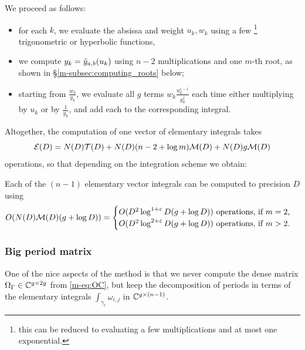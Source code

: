 \documentclass[main.tex]{subfiles}
\begin{document}
   We proceed as follows:
   \begin{itemize}
   \item for each $k$, we evaluate the absissa and weight $u_k,w_k$ using
       a few \footnote{this can be reduced to evaluating
           a few multiplications and at most one exponential.} trigonometric or hyperbolic functions,
   \item we compute $y_k=\tilde{y}_{a,b}(u_k)$ using $n-2$ multiplications and one $m$-th root,
       as shown in \S \ref{m-subsec:computing_roots} below;
   \item starting from $\frac{w_k}{y_k}$, we evaluate all $g$ terms $w_k\frac{u_k^{i-1}}{y_k^j}$
       each time either multiplying by $u_k$ or by $\frac{1}{y_k}$, and add each to the corresponding
       integral.
   \end{itemize}

   Altogether, the computation of one vector of elementary integrals takes
   \begin{equation}\label{eq:elem_int_complexity}
    \mathcal E(D) = N(D)\mathcal T(D)+N(D)(n-2+\log m)\mathcal M(D)+N(D)g\mathcal M(D)
   \end{equation}
    operations,
   so that depending on the integration scheme we obtain:
   \begin{thm}\label{thm:complexity_integrals}
       Each of the $(n-1)$ elementary vector integrals can be computed to precision $D$ using
       \begin{equation*}
           O(N(D)\mathcal M(D)(g+\log D)) =
           \begin{cases}
               O(D^2\log^{1+\varepsilon} D (g + \log D)) \text{ operations, if $m=2$,}\\
               O(D^2\log^{2+\varepsilon} D (g + \log D)) \text{ operations, if $m>2$.}
           \end{cases}
       \end{equation*}
   \end{thm}

   \subsubsection{Big period matrix}

   One of the nice aspects of the method is that we never compute
   the dense matrix $\Omega_{\Gamma}\in\mathbb{C}^{g\times 2g}$ from \eqref{m-eq:OC}, but
   keep the decomposition of periods in terms of the elementary integrals
   $\int_{\gamma_e}\omega_{i,j}$ in $\mathbb{C}^{g\times (n-1)}$.
\end{document}
